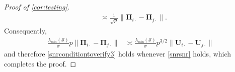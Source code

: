 \documentclass[10pt]{article}
\newcommand{\0}{{\mathbf{0}}}
\newcommand{\1}{{\mathbf{1}}}
\newcommand{\U}{{\mathbf{U}}}
\renewcommand{\t}{^{\top}}
\newcommand{\uhat}{\mathbf{\hat{U}}}
\newcommand{\inv}{^{-1}}
\renewcommand{\hat}{\widehat}
\renewcommand{\hat}{\widehat}
\begin{document}
\begin{proof}[Proof of \cref{cor:testing}]
\begin{align*}
    &\asymp \frac{1}{\sqrt{p}} \| \mathbf{\Pi}_{i\cdot} - \mathbf{\Pi}_{j\cdot} \|.
\end{align*}
Consequently, 
\begin{align*}
    \frac{\lambda_{\min}(\mathcal{S})}{\sigma} p  \| \mathbf{\Pi}_{i\cdot} - \mathbf{\Pi}_{j\cdot} \| &\asymp   \frac{\lambda_{\min}(\mathcal{S})}{\sigma}p^{3/2}  \| \U_{i\cdot} - \U_{j\cdot} \|
\end{align*}
and therefore \eqref{snrconditiontoverify3} holds whenever \eqref{snrsnr} holds, which completes the proof.

\end{proof}
\end{document}
